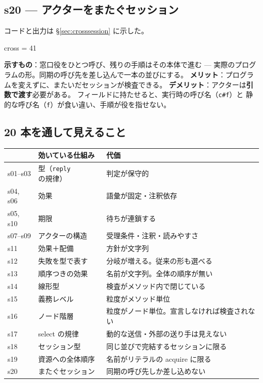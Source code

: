 \documentclass[11pt,a4paper]{ltjsarticle}
\theoremstyle{definition}
\theoremstyle{remark}
\begin{document}
\subsection{s20 --- アクターをまたぐセッション}
コードと出力は \S\ref{sec:crosssession} に示した。
\begin{term}
cross = 41
\end{term}
\textbf{示すもの}：窓口役をひとつ呼び、残りの手順はその本体で進む ---
実際のプログラムの形。同期の呼び先を差し込んで一本の並びにする。
\textbf{メリット}：プログラムを変えずに、またいだセッションが検査できる。
\textbf{デメリット}：アクターは\textbf{引数で渡す}必要がある。
フィールドに持たせると、実行時の呼び名（\texttt{c\#f}）と
静的な呼び名（\texttt{f}）が食い違い、手順が役を指せない。

\subsection{20 本を通して見えること}

\begin{center}
\begin{tabular}{lll}
\toprule
& 効いている仕組み & 代価 \\
\midrule
s01--s03 & 型（\texttt{reply} の規律） & 判定が保守的 \\
s04, s06 & 効果 & 語彙が固定・注釈依存 \\
s05, s10 & 期限 & 待ちが連鎖する \\
s07--s09 & アクターの構造 & 受理条件・注釈・読みやすさ \\
s11 & 効果＋配備 & 方針が文字列 \\
s12 & 失敗を型で表す & 分岐が増える。従来の形も選べる \\
s13 & 順序つきの効果 & 名前が文字列。全体の順序が無い \\
s14 & 線形型 & 検査がメソッド内で閉じている \\
s15 & 義務レベル & 粒度がメソッド単位 \\
s16 & ノード階層 & 粒度がノード単位。宣言しなければ検査されない \\
s17 & select の規律 & 動的な送信・外部の送り手は見えない \\
s18 & セッション型 & 同じ並びで完結するセッションに限る \\
s19 & 資源への全体順序 & 名前がリテラルの acquire に限る \\
s20 & またぐセッション & 同期の呼び先しか差し込めない \\
\bottomrule
\end{tabular}
\end{center}
\end{document}
